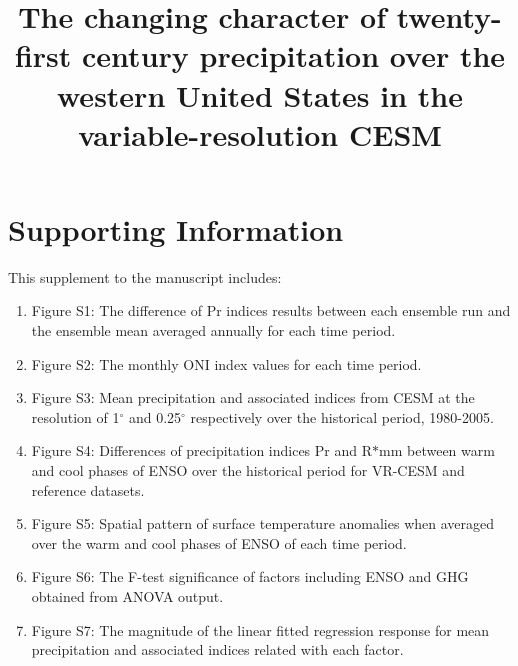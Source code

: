 \documentclass{ametsoc}
\title{The changing character of twenty-first century precipitation over the western United States in the variable-resolution CESM}
\affiliation{Department of Land, Air and Water Resources, University of California, Davis}
\begin{document}

\section{Supporting Information}

This supplement to the manuscript includes:

\begin{enumerate}

\item Figure S1: The difference of Pr indices results between each ensemble run and the ensemble mean averaged annually for each time period.

\item Figure S2: The monthly ONI index values for each time period.

\item Figure S3: Mean precipitation and associated indices from CESM at the resolution of 1$^\circ$ and 0.25$^\circ$ respectively over the historical period, 1980-2005.

\item Figure S4: Differences of precipitation indices Pr and R$\ast$mm between warm and cool phases of ENSO over the historical period for VR-CESM and reference datasets.

\item Figure S5: Spatial pattern of surface temperature anomalies when averaged over the warm and cool phases of ENSO of each time period.

\item Figure S6: The F-test significance of factors including ENSO and GHG obtained from ANOVA output.

\item Figure S7: The magnitude of the linear fitted regression response for mean precipitation and associated indices related with each factor.

\end{enumerate}


%

\end{document}
